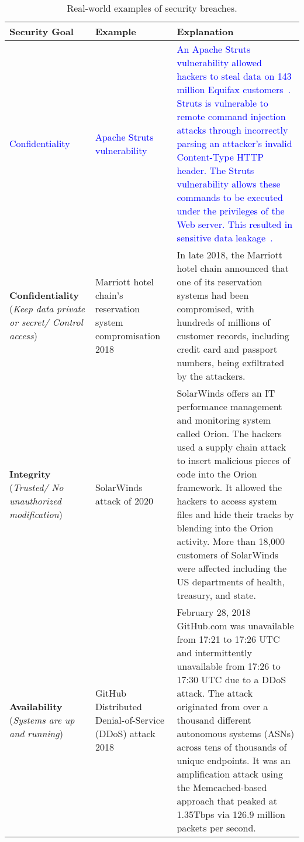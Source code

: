 \documentclass[11pt,letterpaper]{article}
\begin{document}
\begin{table}[htbp]
    \caption{Real-world examples of security breaches.
    }
    \begin{tabularx}{\columnwidth}{|p{3.4cm}|p{3.4cm}|X|}
        \hline
        \textbf{Security Goal} & \textbf{Example} & \textbf{Explanation}  \\
        
        \hline
        \textcolor{blue}{Confidentiality} & 
        \textcolor{blue}{Apache Struts vulnerability} & 
        \textcolor{blue}{An Apache Struts vulnerability allowed hackers to steal data on 143 million Equifax customers~\cite{luszcz2018apache}. Struts is vulnerable to remote command injection attacks through incorrectly parsing an attacker’s invalid Content-Type HTTP header. The Struts vulnerability allows these commands to be executed under the privileges of the Web server. This resulted in sensitive data leakage~\cite{apachestruts}.}
        \\ \hline
        
        \hline
        \textbf{Confidentiality} (\textit{Keep data private or secret/ Control access}) & Marriott hotel chain's reservation system compromisation 2018
        & In late 2018, the Marriott hotel chain announced that one of its reservation systems had been compromised, with hundreds of millions of customer records, including credit card and passport numbers, being exfiltrated by the attackers\cite{fruhlinger_marriott_2020}.
        \\ \hline
        
        \hline
        \textbf{Integrity} (\textit{Trusted/ No unauthorized modification}) & 
        SolarWinds attack of 2020
        &  SolarWinds offers an IT performance management and monitoring system called Orion. The hackers used a supply chain attack to insert malicious pieces of code into the Orion framework. It allowed the hackers to access system files and hide their tracks by blending into the Orion activity. More than 18,000 customers of SolarWinds were affected including  the US departments of health, treasury, and state\cite{noauthor_solarwinds_nodate}.
        \\ \hline
        
        \hline
        \textbf{Availability} (\textit{Systems are up and running}) &
        GitHub Distributed Denial-of-Service (DDoS) attack 2018 &
        February 28, 2018 GitHub.com was unavailable from 17:21 to 17:26 UTC and intermittently unavailable from 17:26 to 17:30 UTC due to a DDoS attack. The attack originated from over a thousand different autonomous systems (ASNs) across tens of thousands of unique endpoints. It was an amplification attack using the Memcached-based approach that peaked at 1.35Tbps via 126.9 million packets per second\cite{kottler_february_2018}.
        \\ \hline
        

\end{tabularx}
\end{table}
\end{document}
